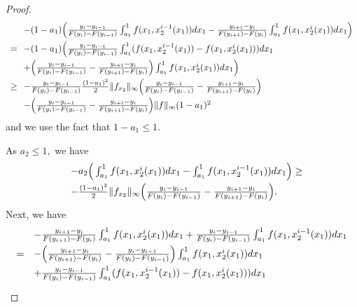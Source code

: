 \documentclass[12pt,reqno]{amsart}
\begin{document}
\begin{proof}
\[\begin{array}{ll}
&\hspace{-3pt}-(1-a_1)\Big(\frac{y_{i}-y_{i-1}}{F(y_{i})-F(y_{i-1})}\int_{a_1}^{1}f(x_1,x_2^{i-1}(x_1))dx_1-\frac{y_{i+1}-y_i}{F(y_{i+1})-F(y_{i})}\int_{a_1}^{1}f(x_1,x_2^{i}(x_1))dx_1\Big)\vspace{3pt}\\
=&\hspace{-3pt}-(1-a_1)\Big(\frac{y_{i}-y_{i-1}}{F(y_{i})-F(y_{i-1})}\int_{a_1}^{1}(f(x_1,x_2^{i-1}(x_1))-f(x_1,x_2^{i}(x_1)))dx_1\vspace{3pt}\\
&\hspace{-3pt}+\Big(\frac{y_{i}-y_{i-1}}{F(y_{i})-F(y_{i-1})}-\frac{y_{i+1}-y_i}{F(y_{i+1})-F(y_{i})}\Big)\int_{a_1}^{1}f(x_1,x_2^{i}(x_1))dx_1\Big)\vspace{3pt}\\

\ge&\hspace{-3pt}-\frac{y_{i}-y_{i-1}}{F(y_{i})-F(y_{i-1})}\frac{(1-a_1)^2}{2}\|f_{x_2}\|_\infty\Big(\frac{y_i-y_{i-1}}{F(y_i)-F(y_{i-1})}-\frac{y_{i+1}-y_i}{F(y_{i+1})-F(y_i)}\Big)\vspace{3pt}\\
&\hspace{-3pt}-\Big(\frac{y_{i}-y_{i-1}}{F(y_{i})-F(y_{i-1})}-\frac{y_{i+1}-y_i}{F(y_{i+1})-F(y_{i})}\Big)\|f\|_\infty(1-a_1)^2
\end{array}\]
and we use the fact that $1-a_1\le1.$

As $a_2\le1,$ we have 
\[\begin{array}{ll}
&-a_2\Big(\int_{a_1}^{1}f(x_1,x_2^{i}(x_1))dx_1-\int_{a_1}^{1}f(x_1,x_2^{i-1}(x_1))dx_1\Big)\ge \vspace{3pt}\\
&-\frac{(1-a_1)^2}{2}\|f_{x_2}\|_\infty\Big(\frac{y_i-y_{i-1}}{F(y_i)-F(y_{i-1})}-\frac{y_{i+1}-y_i}{F(y_{i+1})-F(y_i)}\Big).
\end{array}\]
 Next, we have 
 \[\begin{array}{ll}
     & -\frac{y_{i+1}-y_i}{F(y_{i+1})-F(y_{i})}\int_{a_1}^{1}f(x_1,x_2^{i}(x_1))dx_1+\frac{y_{i}-y_{i-1}}{F(y_{i})-F(y_{i-1})}\int_{a_1}^{1}f(x_1,x_2^{i-1}(x_1))dx_1\vspace{3pt} \\
    
     =&-\Big(\frac{y_{i+1}-y_i}{F(y_{i+1})-F(y_{i})}-\frac{y_{i}-y_{i-1}}{F(y_{i})-F(y_{i-1})}\Big)\int_{a_1}^{1}f(x_1,x_2^{i}(x_1))dx_1\vspace{3pt}\\
     &+\frac{y_{i}-y_{i-1}}{F(y_{i})-F(y_{i-1})}\int_{a_1}^{1}(f(x_1,x_2^{i-1}(x_1))-f(x_1,x_2^{i}(x_1)))dx_1\vspace{3pt} \\
     

\end{array}\]
\end{proof}
\end{document}

